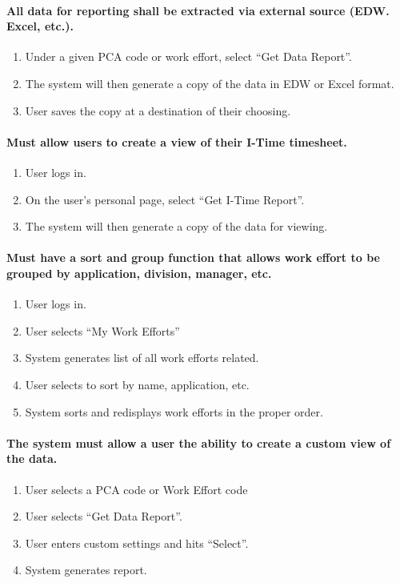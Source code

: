 \documentclass[letterpaper]{article}
\begin{document}
\paragraph{All data for reporting shall be extracted via external source (EDW. Excel, etc.).}
\begin{enumerate}
\item Under a given PCA code or work effort, select ``Get Data Report''.
\item The system will then generate a copy of the data in EDW or Excel format.
\item User saves the copy at a destination of their choosing.
\end{enumerate}

\paragraph{Must allow users to create a view of their I-Time timesheet.}
\begin{enumerate}
\item User logs in.
\item On the user's personal page, select ``Get I-Time Report''.
\item The system will then generate a copy of the data for viewing.
\end{enumerate}

\paragraph{Must have a sort and group function that allows work effort to be grouped by application, division, manager, etc.}
\begin{enumerate}
\item User logs in.
\item User selects ``My Work Efforts''
\item System generates list of all work efforts related.
\item User selects to sort by name, application, etc.
\item System sorts and redisplays work efforts in the proper order.
\end{enumerate}

\paragraph{The system must allow a user the ability to create a custom view of the data.}
\begin{enumerate}
\item User selects a PCA code or Work Effort code
\item User selects ``Get Data Report''.
\item User enters custom settings and hits ``Select''.
\item System generates report.
\end{enumerate}
\end{document}
